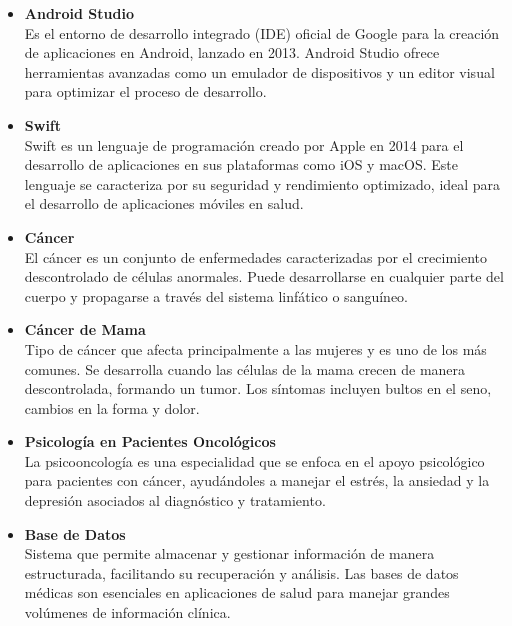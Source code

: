 \begin{itemize}
    \item \textbf{Android Studio} \\
    Es el entorno de desarrollo integrado (IDE) oficial de Google para la creación de aplicaciones en Android, lanzado en 2013. Android Studio ofrece herramientas avanzadas como un emulador de dispositivos y un editor visual para optimizar el proceso de desarrollo. \parencite{developerandroid2023, santaella2023}

    \item \textbf{Swift} \\
    Swift es un lenguaje de programación creado por Apple en 2014 para el desarrollo de aplicaciones en sus plataformas como iOS y macOS. Este lenguaje se caracteriza por su seguridad y rendimiento optimizado, ideal para el desarrollo de aplicaciones móviles en salud. \parencite{apple2023, fernandez2023}

    \item \textbf{Cáncer} \\
    El cáncer es un conjunto de enfermedades caracterizadas por el crecimiento descontrolado de células anormales. Puede desarrollarse en cualquier parte del cuerpo y propagarse a través del sistema linfático o sanguíneo. \parencite{institutonacionalcancer2023}

    \item \textbf{Cáncer de Mama} \\
    Tipo de cáncer que afecta principalmente a las mujeres y es uno de los más comunes. Se desarrolla cuando las células de la mama crecen de manera descontrolada, formando un tumor. Los síntomas incluyen bultos en el seno, cambios en la forma y dolor. \parencite{mayoclinic2023}

    \item \textbf{Psicología en Pacientes Oncológicos} \\
    La psicooncología es una especialidad que se enfoca en el apoyo psicológico para pacientes con cáncer, ayudándoles a manejar el estrés, la ansiedad y la depresión asociados al diagnóstico y tratamiento. \parencite{oncosalud2023, areahumana2023, terapify2023}

    \item \textbf{Base de Datos} \\
    Sistema que permite almacenar y gestionar información de manera estructurada, facilitando su recuperación y análisis. Las bases de datos médicas son esenciales en aplicaciones de salud para manejar grandes volúmenes de información clínica. \parencite{perez2007, nutanix2023}



\end{itemize}
